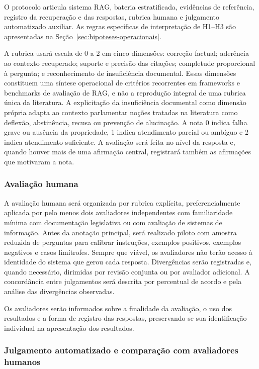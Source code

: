 O protocolo articula sistema RAG, bateria estratificada, evidências de referência, registro da recuperação e das respostas, rubrica humana e julgamento automatizado auxiliar. As regras específicas de interpretação de H1--H3 são apresentadas na Seção~\ref{sec:hipoteses-operacionais}.

A rubrica usará escala de 0 a 2 em cinco dimensões: correção factual; aderência ao contexto recuperado; suporte e precisão das citações; completude proporcional à pergunta; e reconhecimento de insuficiência documental. Essas dimensões constituem uma síntese operacional de critérios recorrentes em frameworks e benchmarks de avaliação de RAG, e não a reprodução integral de uma rubrica única da literatura. A explicitação da insuficiência documental como dimensão própria adapta ao contexto parlamentar noções tratadas na literatura como deflexão, abstinência, recusa ou prevenção de alucinação. A nota 0 indica falha grave ou ausência da propriedade, 1 indica atendimento parcial ou ambíguo e 2 indica atendimento suficiente. A avaliação será feita no nível da resposta e, quando houver mais de uma afirmação central, registrará também as afirmações que motivaram a nota.

\subsubsection{Avaliação humana}

A avaliação humana será organizada por rubrica explícita, preferencialmente aplicada por pelo menos dois avaliadores independentes com familiaridade mínima com documentação legislativa ou com avaliação de sistemas de informação. Antes da anotação principal, será realizado piloto com amostra reduzida de perguntas para calibrar instruções, exemplos positivos, exemplos negativos e casos limítrofes. Sempre que viável, os avaliadores não terão acesso à identidade do sistema que gerou cada resposta. Divergências serão registradas e, quando necessário, dirimidas por revisão conjunta ou por avaliador adicional. A concordância entre julgamentos será descrita por percentual de acordo e pela análise das divergências observadas. 

Os avaliadores serão informados sobre a finalidade da avaliação, o uso dos resultados e a forma de registro das respostas, preservando-se sua identificação individual na apresentação dos resultados.

\subsubsection{Julgamento automatizado e comparação com avaliadores humanos}

